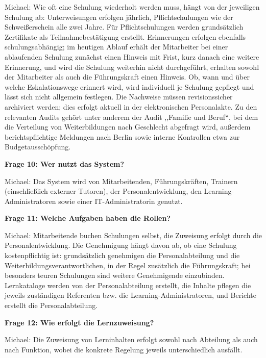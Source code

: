 \documentclass[
    12pt, 
    a4paper,
    ]{scrartcl} %
\begin{document}
Michael: Wie oft eine Schulung wiederholt werden muss, h\"angt von der jeweiligen Schulung ab: Unterweisungen erfolgen j\"ahrlich, Pflichtschulungen wie der Schwei{\ss}erschein alle zwei Jahre. F\"ur Pflichtschulungen werden grunds\"atzlich Zertifikate als Teilnahmebest\"atigung erstellt. Erinnerungen erfolgen ebenfalls schulungsabh\"angig; im heutigen Ablauf erh\"alt der Mitarbeiter bei einer ablaufenden Schulung zun\"achst einen Hinweis mit Frist, kurz danach eine weitere Erinnerung, und wird die Schulung weiterhin nicht durchgef\"uhrt, erhalten sowohl der Mitarbeiter als auch die F\"uhrungskraft einen Hinweis. Ob, wann und \"uber welche Eskalationswege erinnert wird, wird individuell je Schulung gepflegt und l\"asst sich nicht allgemein festlegen. Die Nachweise m\"ussen revisionssicher archiviert werden; dies erfolgt aktuell in der elektronischen Personalakte. Zu den relevanten Audits geh\"ort unter anderem der Audit ,,Familie und Beruf``, bei dem die Verteilung von Weiterbildungen nach Geschlecht abgefragt wird, au{\ss}erdem berichtspflichtige Meldungen nach Berlin sowie interne Kontrollen etwa zur Budgetaussch\"opfung.

\bigskip
{}

\textbf{Frage 10: Wer nutzt das System?}

Michael: Das System wird von Mitarbeitenden, F\"uhrungskr\"aften, Trainern (einschlie{\ss}lich externer Tutoren), der Personalentwicklung, den Learning-Administratoren sowie einer IT-Administratorin genutzt.

\medskip
\textbf{Frage 11: Welche Aufgaben haben die Rollen?}

Michael: Mitarbeitende buchen Schulungen selbst, die Zuweisung erfolgt durch die Personalentwicklung. Die Genehmigung h\"angt davon ab, ob eine Schulung kostenpflichtig ist: grunds\"atzlich genehmigen die Personalabteilung und die Weiterbildungsverantwortlichen, in der Regel zus\"atzlich die F\"uhrungskraft; bei besonders teuren Schulungen sind weitere Genehmigende einzubinden. Lernkataloge werden von der Personalabteilung erstellt, die Inhalte pflegen die jeweils zust\"andigen Referenten bzw. die Learning-Administratoren, und Berichte erstellt die Personalabteilung.

\bigskip
{}

\textbf{Frage 12: Wie erfolgt die Lernzuweisung?}

Michael: Die Zuweisung von Lerninhalten erfolgt sowohl nach Abteilung als auch nach Funktion, wobei die konkrete Regelung jeweils unterschiedlich ausf\"allt.
\end{document}
